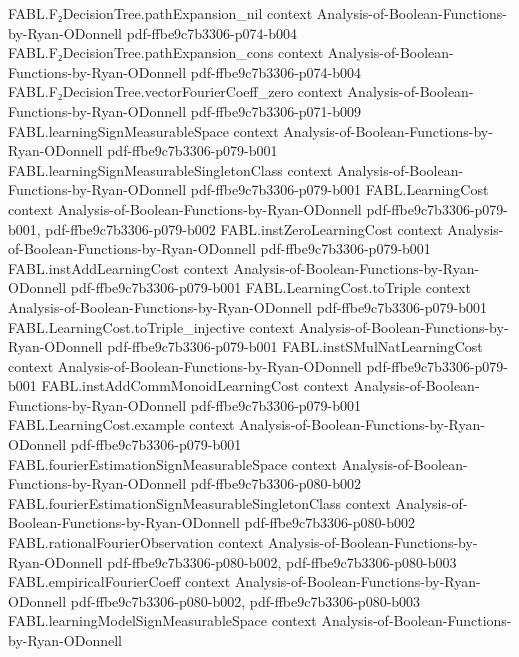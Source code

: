 \begin{theorem}
\proofstep
  {FABL.F₂DecisionTree.pathExpansion_nil}
  {context}
  {Analysis-of-Boolean-Functions-by-Ryan-ODonnell}
  {pdf-ffbe9c7b3306-p074-b004}
\proofstep
  {FABL.F₂DecisionTree.pathExpansion_cons}
  {context}
  {Analysis-of-Boolean-Functions-by-Ryan-ODonnell}
  {pdf-ffbe9c7b3306-p074-b004}
\proofstep
  {FABL.F₂DecisionTree.vectorFourierCoeff_zero}
  {context}
  {Analysis-of-Boolean-Functions-by-Ryan-ODonnell}
  {pdf-ffbe9c7b3306-p071-b009}
\proofstep
  {FABL.learningSignMeasurableSpace}
  {context}
  {Analysis-of-Boolean-Functions-by-Ryan-ODonnell}
  {pdf-ffbe9c7b3306-p079-b001}
\proofstep
  {FABL.learningSignMeasurableSingletonClass}
  {context}
  {Analysis-of-Boolean-Functions-by-Ryan-ODonnell}
  {pdf-ffbe9c7b3306-p079-b001}
\proofstep
  {FABL.LearningCost}
  {context}
  {Analysis-of-Boolean-Functions-by-Ryan-ODonnell}
  {pdf-ffbe9c7b3306-p079-b001,
    pdf-ffbe9c7b3306-p079-b002}
\proofstep
  {FABL.instZeroLearningCost}
  {context}
  {Analysis-of-Boolean-Functions-by-Ryan-ODonnell}
  {pdf-ffbe9c7b3306-p079-b001}
\proofstep
  {FABL.instAddLearningCost}
  {context}
  {Analysis-of-Boolean-Functions-by-Ryan-ODonnell}
  {pdf-ffbe9c7b3306-p079-b001}
\proofstep
  {FABL.LearningCost.toTriple}
  {context}
  {Analysis-of-Boolean-Functions-by-Ryan-ODonnell}
  {pdf-ffbe9c7b3306-p079-b001}
\proofstep
  {FABL.LearningCost.toTriple_injective}
  {context}
  {Analysis-of-Boolean-Functions-by-Ryan-ODonnell}
  {pdf-ffbe9c7b3306-p079-b001}
\proofstep
  {FABL.instSMulNatLearningCost}
  {context}
  {Analysis-of-Boolean-Functions-by-Ryan-ODonnell}
  {pdf-ffbe9c7b3306-p079-b001}
\proofstep
  {FABL.instAddCommMonoidLearningCost}
  {context}
  {Analysis-of-Boolean-Functions-by-Ryan-ODonnell}
  {pdf-ffbe9c7b3306-p079-b001}
\proofstep
  {FABL.LearningCost.example}
  {context}
  {Analysis-of-Boolean-Functions-by-Ryan-ODonnell}
  {pdf-ffbe9c7b3306-p079-b001}
\proofstep
  {FABL.fourierEstimationSignMeasurableSpace}
  {context}
  {Analysis-of-Boolean-Functions-by-Ryan-ODonnell}
  {pdf-ffbe9c7b3306-p080-b002}
\proofstep
  {FABL.fourierEstimationSignMeasurableSingletonClass}
  {context}
  {Analysis-of-Boolean-Functions-by-Ryan-ODonnell}
  {pdf-ffbe9c7b3306-p080-b002}
\proofstep
  {FABL.rationalFourierObservation}
  {context}
  {Analysis-of-Boolean-Functions-by-Ryan-ODonnell}
  {pdf-ffbe9c7b3306-p080-b002,
    pdf-ffbe9c7b3306-p080-b003}
\proofstep
  {FABL.empiricalFourierCoeff}
  {context}
  {Analysis-of-Boolean-Functions-by-Ryan-ODonnell}
  {pdf-ffbe9c7b3306-p080-b002,
    pdf-ffbe9c7b3306-p080-b003}
\proofstep
  {FABL.learningModelSignMeasurableSpace}
  {context}
  {Analysis-of-Boolean-Functions-by-Ryan-ODonnell}

\end{theorem}
